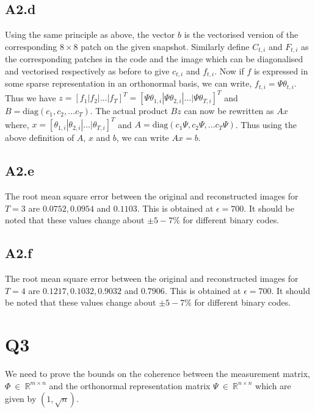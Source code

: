 \documentclass{article}
\begin{document}
\subsection*{A2.d}

Using the same principle as above, the vector $b$ is the vectorised version of the corresponding $8 \times 8$ patch on the given snapshot.
Similarly define $C_{t,i}$ and $F_{t,i}$ as the corresponding patches in the code and the image which can be diagonalised and vectorised respectively as before to give $c_{t,i}$ and $f_{t,i}$. Now if $f$ is expressed in some sparse representation in an orthonormal basis, we can write, $f_{t,i} = \Psi \theta_{t,i}$. Thus we have $z = [f_1 | f_2 | \dots |f_T ]^T = [ \Psi \theta_{1,i} | \Psi \theta_{2,i} | \dots | \Psi \theta_{T,i}]^T $ and $ B = \text{diag}(c_1, c_2, \dots c_T) $. The actual product $Bz$ can now be rewritten as $Ax$ where, $ x = [  \theta_{1,i} |  \theta_{2,i} | \dots |  \theta_{T,i}]^T $ and $A = \text{diag}(c_1 \Psi, c_2 \Psi , \dots c_T \Psi) $. Thus using the above definition of $A$, $x$ and $b$, we can write $Ax = b$.

\subsection*{A2.e}

The root mean square error between the original and reconstructed images for $T = 3$ are $0.0752, 0.0954$ and $0.1103$. This is obtained at $\epsilon = 700$. It should be noted that these values change about $\pm 5- 7\%$ for different binary codes.

\subsection*{A2.f}

The root mean square error between the original and reconstructed images for $T = 4$ are $0.1217, 0.1032, 0.9032$ and $0.7906$. This is obtained at $\epsilon = 700$. It should be noted that these values change about $\pm 5- 7\%$ for different binary codes.


\section*{Q3}

We need to prove the bounds on the coherence between the measurement matrix, $\Phi \ \in \ \mathbb{R}^{m \times n}$ and the orthonormal representation matrix $\Psi \ \in \ \mathbb{R}^{n \times n}$ which are given by $(1, \sqrt{n})$. 
\end{document}
